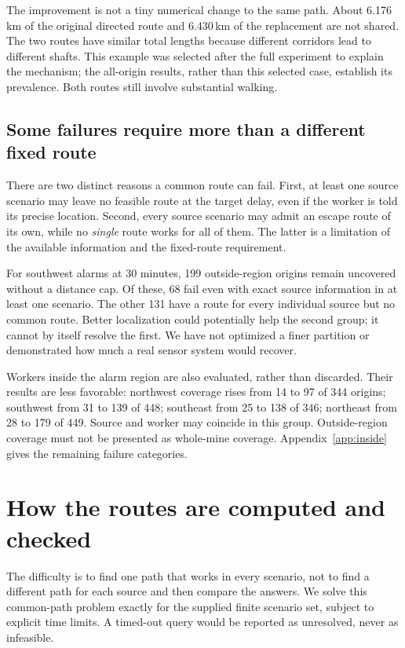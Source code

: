 \documentclass[11pt,a4paper]{article}
\begin{document}
The improvement is not a tiny numerical change to the same path. About 6.176\,km of the original directed route and 6.430\,km of the replacement are not shared. The two routes have similar total lengths because different corridors lead to different shafts. This example was selected after the full experiment to explain the mechanism; the all-origin results, rather than this selected case, establish its prevalence. Both routes still involve substantial walking.

\subsection{Some failures require more than a different fixed route}\label{sec:failures}
There are two distinct reasons a common route can fail. First, at least one source scenario may leave no feasible route at the target delay, even if the worker is told its precise location. Second, every source scenario may admit an escape route of its own, while no \emph{single} route works for all of them. The latter is a limitation of the available information and the fixed-route requirement.

For southwest alarms at 30 minutes, 199 outside-region origins remain uncovered without a distance cap. Of these, 68 fail even with exact source information in at least one scenario. The other 131 have a route for every individual source but no common route. Better localization could potentially help the second group; it cannot by itself resolve the first. We have not optimized a finer partition or demonstrated how much a real sensor system would recover.

Workers inside the alarm region are also evaluated, rather than discarded. Their results are less favorable: northwest coverage rises from 14 to 97 of 344 origins; southwest from 31 to 139 of 448; southeast from 25 to 138 of 346; northeast from 28 to 179 of 449. Source and worker may coincide in this group. Outside-region coverage must not be presented as whole-mine coverage. Appendix~\ref{app:inside} gives the remaining failure categories.

\section{How the routes are computed and checked}\label{sec:compute}
The difficulty is to find one path that works in every scenario, not to find a different path for each source and then compare the answers. We solve this common-path problem exactly for the supplied finite scenario set, subject to explicit time limits. A timed-out query would be reported as unresolved, never as infeasible.
\end{document}
